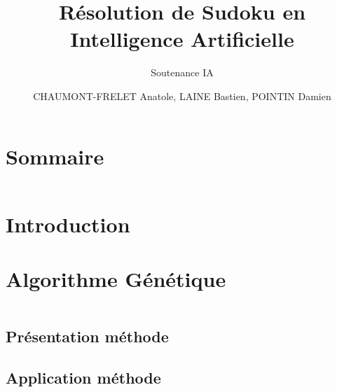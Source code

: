 \documentclass{beamer}
\title{Résolution de Sudoku en Intelligence Artificielle}
\subtitle{Soutenance IA}
\author{CHAUMONT-FRELET Anatole, LAINE Bastien, POINTIN Damien}
\institute{Génie Mathématique | INSA Rouen}
\begin{document}
    \beamertemplatenavigationsymbolsempty

    \begin{frame}
        \titlepage{}
    \end{frame}

    \section*{Sommaire}
        \begin{frame}
            \begin{columns}[t]
  				\begin{column}{5cm}
  					\tableofcontents[sections={1-4}]
  				\end{column}
  				\begin{column}{5cm}
  					\tableofcontents[sections={5-8}]
  				\end{column}
  			\end{columns}
        \end{frame}

    \section{Introduction}
        \subsection{ }
            

    \section{Algorithme Génétique}
        \begin{frame}
            \begin{columns}[t]
  				\begin{column}{5cm}
  					\tableofcontents[sections={1-4}, currentsection]
  				\end{column}
  				\begin{column}{5cm}
  					\tableofcontents[sections={5-8}, currentsection]
  				\end{column}
  			\end{columns}
        \end{frame}
        \subsection{Présentation méthode}
	        
	    \subsection{Application méthode}
        	
\end{document}
